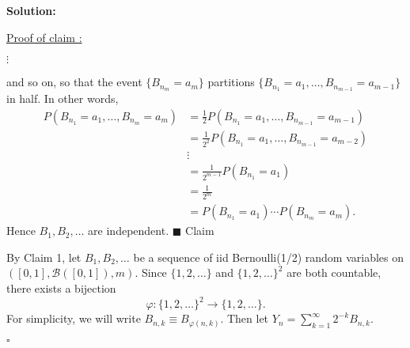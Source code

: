 \documentclass[12pt]{article}
\newcounter{ProofCounter}
\newcounter{ClaimCounter}[ProofCounter]
\newenvironment{Solution}{\stepcounter{ProofCounter}\textbf{Solution:}}{\hfill$\square$}
\newenvironment{claimproof}[1]{\par\noindent\underline{Proof of claim \theClaimCounter:}\space#1}{\hfill $\blacksquare$ Claim \theClaimCounter}
\begin{document}
\begin{Solution}
\begin{claimproof}
\begin{enumerate}
        $\vdots$
    \end{enumerate}
    and so on, so that the event $\{ B_{n_m} = a_m \}$ partitions $\{ B_{n_1} = a_1, \dots, B_{n_{m-1}} = a_{m-1} \}$ in half. In other words,
    \begin{align*}
      P(B_{n_1} = a_1, \dots, B_{n_m} = a_m) & = \frac{1}{2} P(B_{n_1} = a_1, \dots, B_{n_{m-1}} = a_{m-1}) \\
      & = \frac{1}{2^2} P(B_{n_1} = a_1, \dots, B_{n_{m-1}} = a_{m-2}) \\
      & \vdots \\
      & = \frac{1}{2^{m-1}} P(B_{n_1} = a_1) \\
      & = \frac{1}{2^{m}} \\
      & = P(B_{n_1} = a_1) \cdots P(B_{n_m} = a_m).
    \end{align*}
    Hence $B_1, B_2, \dots$ are independent.
  \end{claimproof}

  By Claim 1, let $B_1, B_2, \dots$ be a sequence of iid Bernoulli(1/2) random variables on $([0, 1], \mathcal{B}([0,1]), m)$. Since $\{ 1, 2, \dots \}$ and $\{ 1, 2, \dots \}^2$ are both countable, there exists a bijection
  \[
    \varphi : \{1, 2, \dots \}^2 \rightarrow \{1, 2, \dots \}.
  \]
  For simplicity, we will write $B_{n,k} \equiv B_{\varphi(n,k)}$. Then let $Y_n = \sum_{k=1}^{\infty} 2^{-k} B_{n,k}$.


\end{Solution}
\end{document}
